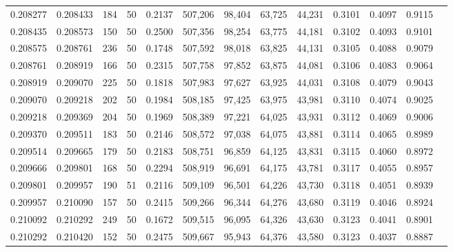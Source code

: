 \begin{tabular}{rrrrrrrrrrrrr}
0.208277 & 0.208433 &   184 &  50 &                                     0.2137 & 507,206 &  98,404 &  63,725 &  44,231 & 0.3101 & 0.4097 & 0.9115 \\
0.208435 & 0.208573 &   150 &  50 &                                     0.2500 & 507,356 &  98,254 &  63,775 &  44,181 & 0.3102 & 0.4093 & 0.9101 \\
0.208575 & 0.208761 &   236 &  50 &                                     0.1748 & 507,592 &  98,018 &  63,825 &  44,131 & 0.3105 & 0.4088 & 0.9079 \\
0.208761 & 0.208919 &   166 &  50 &                                     0.2315 & 507,758 &  97,852 &  63,875 &  44,081 & 0.3106 & 0.4083 & 0.9064 \\
0.208919 & 0.209070 &   225 &  50 &                                     0.1818 & 507,983 &  97,627 &  63,925 &  44,031 & 0.3108 & 0.4079 & 0.9043 \\
0.209070 & 0.209218 &   202 &  50 &                                     0.1984 & 508,185 &  97,425 &  63,975 &  43,981 & 0.3110 & 0.4074 & 0.9025 \\
0.209218 & 0.209369 &   204 &  50 &                                     0.1969 & 508,389 &  97,221 &  64,025 &  43,931 & 0.3112 & 0.4069 & 0.9006 \\
0.209370 & 0.209511 &   183 &  50 &                                     0.2146 & 508,572 &  97,038 &  64,075 &  43,881 & 0.3114 & 0.4065 & 0.8989 \\
0.209514 & 0.209665 &   179 &  50 &                                     0.2183 & 508,751 &  96,859 &  64,125 &  43,831 & 0.3115 & 0.4060 & 0.8972 \\
0.209666 & 0.209801 &   168 &  50 &                                     0.2294 & 508,919 &  96,691 &  64,175 &  43,781 & 0.3117 & 0.4055 & 0.8957 \\
0.209801 & 0.209957 &   190 &  51 &                                     0.2116 & 509,109 &  96,501 &  64,226 &  43,730 & 0.3118 & 0.4051 & 0.8939 \\
0.209957 & 0.210090 &   157 &  50 &                                     0.2415 & 509,266 &  96,344 &  64,276 &  43,680 & 0.3119 & 0.4046 & 0.8924 \\
0.210092 & 0.210292 &   249 &  50 &                                     0.1672 & 509,515 &  96,095 &  64,326 &  43,630 & 0.3123 & 0.4041 & 0.8901 \\
0.210292 & 0.210420 &   152 &  50 &                                     0.2475 & 509,667 &  95,943 &  64,376 &  43,580 & 0.3123 & 0.4037 & 0.8887 \\

\end{tabular}
